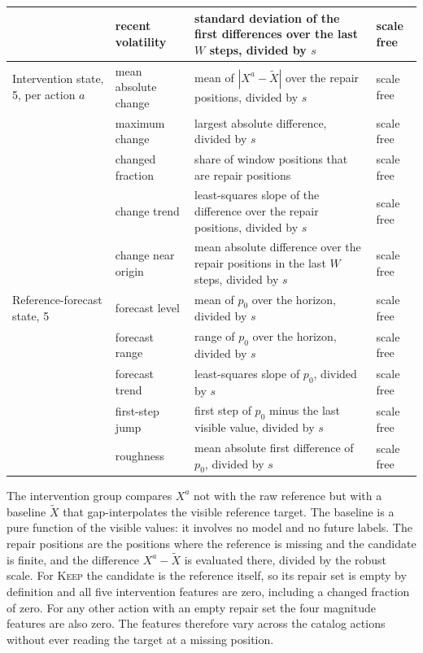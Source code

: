 \documentclass{article}
\begin{document}
\begin{table}[!t]
{\begin{tabular}{@{}l p{} p{} p{}@{}}
     & recent volatility & standard deviation of the first differences over the last $W$ steps, divided by $s$ & scale free \\
    \midrule
    Intervention state, 5, per action $a$ & mean absolute change & mean of $|X^{a} - \tilde{X}|$ over the repair positions, divided by $s$ & scale free \\
     & maximum change & largest absolute difference, divided by $s$ & scale free \\
     & changed fraction & share of window positions that are repair positions & scale free \\
     & change trend & least-squares slope of the difference over the repair positions, divided by $s$ & scale free \\
     & change near origin & mean absolute difference over the repair positions in the last $W$ steps, divided by $s$ & scale free \\
    \midrule
    Reference-forecast state, 5 & forecast level & mean of $p_0$ over the horizon, divided by $s$ & scale free \\
     & forecast range & range of $p_0$ over the horizon, divided by $s$ & scale free \\
     & forecast trend & least-squares slope of $p_0$, divided by $s$ & scale free \\
     & first-step jump & first step of $p_0$ minus the last visible value, divided by $s$ & scale free \\
     & roughness & mean absolute first difference of $p_0$, divided by $s$ & scale free \\
    \bottomrule
  \end{tabular}}
\end{table}

The intervention group compares $X^{a}$ not with the raw reference but with a baseline
$\tilde{X}$ that gap-interpolates the visible reference target. The baseline is a pure
function of the visible values: it involves no model and no future labels. The repair
positions are the positions where the reference is missing and the candidate is finite, and
the difference $X^{a} - \tilde{X}$ is evaluated there, divided by the robust scale. For
\textsc{Keep} the candidate is the reference itself, so its repair set is empty by
definition and all five intervention features are zero, including a changed fraction of
zero. For any other action with an empty repair set the four magnitude features are also
zero. The features therefore vary across the catalog actions without ever reading the
target at a missing position.
\end{document}
